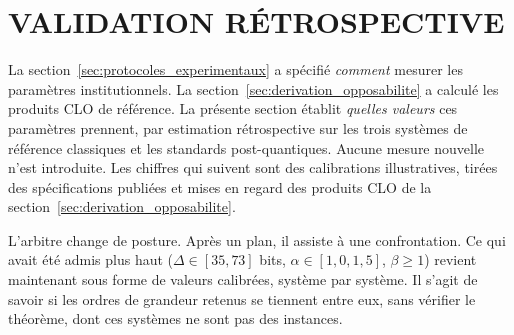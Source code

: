 
\section{VALIDATION R\'ETROSPECTIVE}
\label{sec:validation_retrospective}
\begin{sloppypar}

La section~\ref{sec:protocoles_experimentaux} a sp\'ecifi\'e \emph{comment} mesurer les
param\`etres institutionnels. La section~\ref{sec:derivation_opposabilite} a calcul\'e les
produits CLO de r\'ef\'erence. La pr\'esente section \'etablit \emph{quelles
valeurs} ces param\`etres prennent, par estimation r\'etrospective sur les
trois syst\`emes de r\'ef\'erence classiques et les standards
post-quantiques. Aucune mesure nouvelle n'est introduite. Les chiffres qui
suivent sont des calibrations illustratives, tir\'ees des sp\'ecifications
publi\'ees et mises en regard des produits CLO de la
section~\ref{sec:derivation_opposabilite}.
\end{sloppypar}

\begin{boiteArbitre}
L'arbitre change de posture. Apr\`es un plan, il assiste \`a une
confrontation. Ce qui avait \'et\'e admis plus haut ($\Delta \in [35, 73]$
bits, $\alpha \in [1{,}0, 1{,}5]$, $\beta \geq 1$) revient maintenant sous
forme de valeurs calibr\'ees, syst\`eme par syst\`eme. Il s'agit de savoir
si les ordres de grandeur retenus se tiennent entre eux, sans v\'erifier le
th\'eor\`eme, dont ces syst\`emes ne sont pas des instances.
\end{boiteArbitre}

